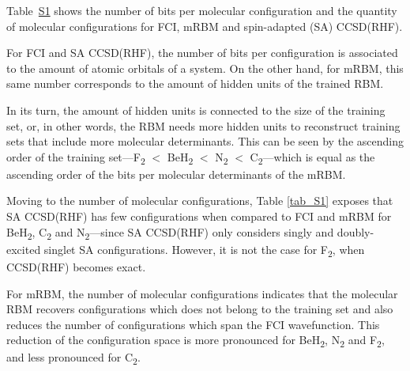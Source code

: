 \documentclass[%
 amsmath,amssymb,
 aps,prl, %
 reprint,%
]{revtex4-1}
\begin{document}
\indent Table~\protect\hyperlink{tab:table_S1}{S1} shows the number of bits per molecular configuration and the quantity of molecular configurations for FCI, mRBM and spin-adapted (SA) CCSD(RHF).

\indent For FCI and SA CCSD(RHF), the number of bits per configuration is associated to the amount of atomic orbitals of a system. On the other hand, for mRBM, this same number corresponds to the amount of hidden units of the trained RBM. 

\indent In its turn, the amount of hidden units is connected to the size of the training set, or, in other words, the RBM needs more hidden units to reconstruct training sets that include more molecular determinants. This can be seen by the ascending order of the training set---F\textsubscript{2} $<$ BeH\textsubscript{2} $<$ N\textsubscript{2} $<$ C\textsubscript{2}---which is equal as the ascending order of the bits per molecular determinants of the mRBM.

\indent Moving to the number of molecular configurations, Table \ref{tab_S1} exposes that SA CCSD(RHF) has few configurations when compared to FCI and mRBM for BeH\textsubscript{2}, C\textsubscript{2} and N\textsubscript{2}---since SA CCSD(RHF) only considers singly and doubly-excited singlet SA configurations. However, it is not the case for F\textsubscript{2}, when CCSD(RHF) becomes exact.

\indent For mRBM, the number of molecular configurations indicates that the molecular RBM recovers configurations which does not belong to the training set and also reduces the number of configurations which span the FCI wavefunction. This reduction of the configuration space is more pronounced for BeH\textsubscript{2}, N\textsubscript{2} and F\textsubscript{2}, and less pronounced for C\textsubscript{2}.  
\end{document}

